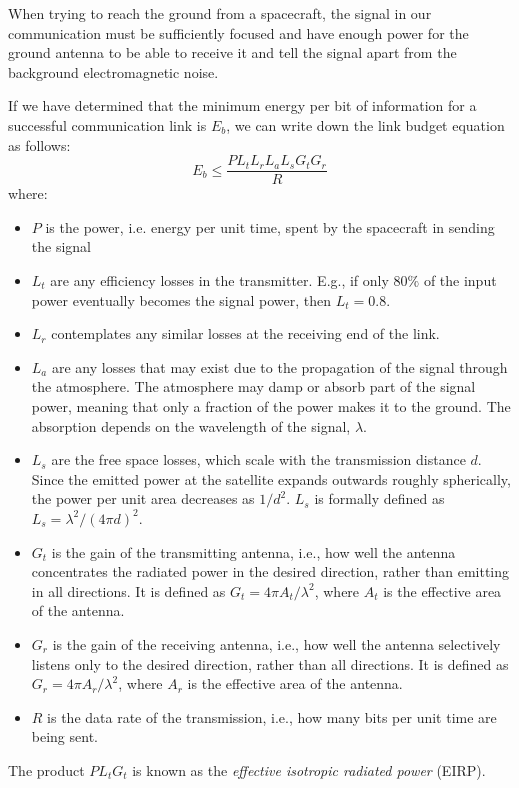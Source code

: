 When trying to reach the ground from a spacecraft, the signal in our 
communication must be sufficiently focused and have enough power for the 
ground antenna to be able to receive it and tell the signal apart from the 
background electromagnetic noise.

If we have determined that the minimum energy per bit of information for a successful communication link is $E_b$, we can write down the link budget equation as follows:
%
\begin{equation}
E_b \leq \frac{P L_t L_r L_a L_s G_t G_r}{R}
\end{equation}
%
where:
%
\begin{itemize}
\item $P$ is the power, i.e. energy per unit time, spent by the spacecraft in 
sending the signal
\item $L_t$ are any efficiency losses in the transmitter. E.g., if only $80\%$ 
of the input power eventually becomes the signal power, then $L_t=0.8$.
\item $L_r$ contemplates any similar losses at the receiving end of the link. 
\item $L_a$ are any losses that may exist due to the propagation of the signal 
through the atmosphere. The atmosphere may damp or absorb part of the signal 
power, meaning that only a fraction of the power makes it to the ground. The 
absorption depends on the wavelength of the signal, $\lambda$.
\item $L_s$ are the free space losses, which scale with the transmission 
distance $d$. Since the emitted power at the satellite expands outwards 
roughly spherically, the power per unit area decreases as $1/d^2$. $L_s$ is 
formally defined as $L_s=\lambda^2 /(4\pi d)^2$.
\item $G_t$ is the gain of the transmitting antenna, i.e., how well the 
antenna concentrates the radiated power in the desired direction, rather than 
emitting in all directions. It is defined as $G_t=4\pi A_t/\lambda^2$, 
where $A_t$ is the effective area of the antenna.
\item $G_r$ is the gain of the receiving antenna, i.e., how well the 
antenna selectively listens only to the desired direction, rather than all 
directions. It is defined as $G_r=4\pi A_r/\lambda^2$, where $A_r$ is the 
effective area of the antenna.
\item $R$ is the data rate of the transmission, i.e., how many bits per unit 
time are being sent.
\end{itemize}
%
The product $PL_t G_t$ is known as the \emph{effective isotropic radiated 
power} (EIRP).

